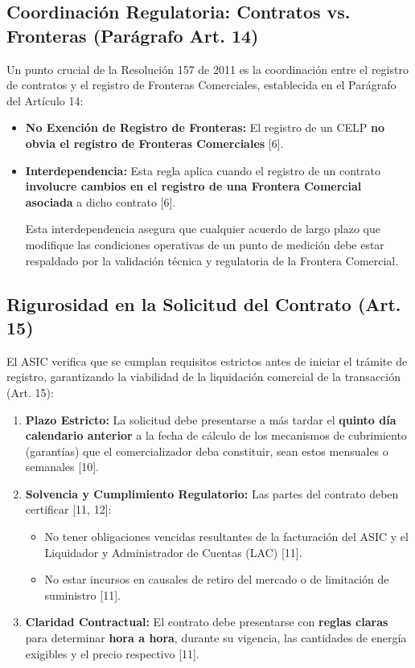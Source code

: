 \documentclass[a5paper]{book}%
\begin{document}
  \subsection{Coordinación Regulatoria: Contratos vs. Fronteras (Parágrafo Art. 14)}
  
  Un punto crucial de la Resolución 157 de 2011 es la coordinación entre el registro de contratos y el registro de Fronteras Comerciales, establecida en el Parágrafo del Artículo 14:
  
  \begin{itemize}
  	\item \textbf{No Exención de Registro de Fronteras:} El registro de un CELP \textbf{no obvia el registro de Fronteras Comerciales} [6].
  	\item \textbf{Interdependencia:} Esta regla aplica cuando el registro de un contrato \textbf{involucre cambios en el registro de una Frontera Comercial asociada} a dicho contrato [6].
  	
  	Esta interdependencia asegura que cualquier acuerdo de largo plazo que modifique las condiciones operativas de un punto de medición debe estar respaldado por la validación técnica y regulatoria de la Frontera Comercial.
  \end{itemize}
  
  \subsection{Rigurosidad en la Solicitud del Contrato (Art. 15)}
  
  El ASIC verifica que se cumplan requisitos estrictos antes de iniciar el trámite de registro, garantizando la viabilidad de la liquidación comercial de la transacción (Art. 15):
  
  \begin{enumerate}
  	\item \textbf{Plazo Estricto:} La solicitud debe presentarse a más tardar el \textbf{quinto día calendario anterior} a la fecha de cálculo de los mecanismos de cubrimiento (garantías) que el comercializador deba constituir, sean estos mensuales o semanales [10].
  	\item \textbf{Solvencia y Cumplimiento Regulatorio:} Las partes del contrato deben certificar [11, 12]:
  	\begin{itemize}
  		\item No tener obligaciones vencidas resultantes de la facturación del ASIC y el Liquidador y Administrador de Cuentas (LAC) [11].
  		\item No estar incursos en causales de retiro del mercado o de limitación de suministro [11].
  	\end{itemize}
  	\item \textbf{Claridad Contractual:} El contrato debe presentarse con \textbf{reglas claras} para determinar \textbf{hora a hora}, durante su vigencia, las cantidades de energía exigibles y el precio respectivo [11].
  \end{enumerate}
  
\end{document}

